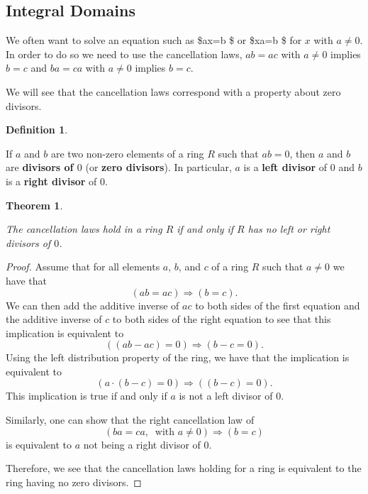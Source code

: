 \documentclass[
]{book}
\newtheorem{theorem}{Theorem}[chapter]
\theoremstyle{definition}
\newtheorem{definition}{Definition}[chapter]
\theoremstyle{definition}
\theoremstyle{definition}
\theoremstyle{definition}
\theoremstyle{remark}
\begin{document}
\hypertarget{integral-domains}{%
\subsection{Integral Domains}\label{integral-domains}}

We often want to solve an equation such as \$ax=b \$ or \$xa=b \$ for \(x\) with \(a\neq 0\). In order to do so we need to use the cancellation laws, \(ab=ac\) with \(a \neq 0\) implies \(b=c\) and \(ba=ca\) with \(a\neq 0\) implies \(b=c\).

We will see that the cancellation laws correspond with a property about zero divisors.

\begin{definition}
\protect\hypertarget{def:unlabeled-div-98}{}\label{def:unlabeled-div-98}

If \(a\) and \(b\) are two non-zero elements of a ring \(R\) such that \(ab=0\), then \(a\) and \(b\) are \textbf{divisors of \(0\)} (or \textbf{zero divisors}). In particular, \(a\) is a \textbf{left divisor} of \(0\) and \(b\) is a \textbf{right divisor} of \(0\).

\end{definition}

\begin{theorem}
\protect\hypertarget{thm:unlabeled-div-99}{}\label{thm:unlabeled-div-99}

The cancellation laws hold in a ring \(R\) if and only if \(R\) has no left or right divisors of \(0\).

\end{theorem}

\begin{proof}

Assume that for all elements \(a\), \(b\), and \(c\) of a ring \(R\) such that \(a\neq 0\) we have that
\[(ab=ac) \Rightarrow (b=c).\] We can then add the additive inverse of \(ac\) to both sides of the first equation and the additive inverse of \(c\) to both sides of the right equation to see that this implication is equivalent to \[\left((ab-ac)=0 \right) \Rightarrow (b-c=0).\] Using the left distribution property of the ring, we have that the implication is equivalent to \[\left( a \cdot (b-c) =0\right) \Rightarrow \left( (b-c)=0\right).\] This implication is true if and only if \(a\) is not a left divisor of \(0\).

Similarly, one can show that the right cancellation law of \[\left(ba=ca, \: \mbox{ with } a \neq 0 \right) \Rightarrow (b=c)\] is equivalent to \(a\) not being a right divisor of \(0\).

Therefore, we see that the cancellation laws holding for a ring is equivalent to the ring having no zero divisors.

\end{proof}
\end{document}
